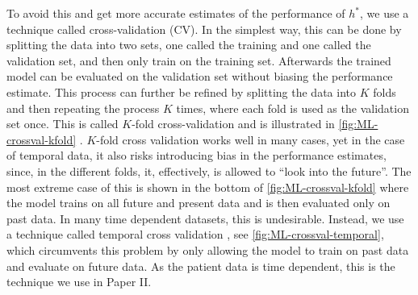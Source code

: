 To avoid this and get more accurate estimates of the performance of $h^*$, we use a technique called cross-validation (CV). In the simplest way, this can be done by splitting the data into two sets, one called the training and one called the validation set, and then only train on the training set. Afterwards the trained model can be evaluated on the validation set without biasing the performance estimate. This process can further be refined by splitting the data into $K$ folds and then repeating the process $K$ times, where each fold is used as the validation set once.
This is called $K$-fold cross-validation and is illustrated in \autoref{fig:ML-crossval-kfold} \autocite{murphyMachineLearningProbabilistic2012,hastieElementsStatisticalLearning2016}.
$K$-fold cross validation works well in many cases, yet in the case of temporal data, it also risks introducing bias in the performance estimates, since, in the different folds, it, effectively, is allowed to ``look into the future''. The most extreme case of this is shown in the bottom of \autoref{fig:ML-crossval-kfold} where the model trains on all future and present data and is then evaluated only on past data. In many time dependent datasets, this is undesirable. Instead, we use a technique called temporal cross validation \autocite{tashmanOutofsampleTestsForecasting2000a}, see \autoref{fig:ML-crossval-temporal}, which circumvents this problem by only allowing the model to train on past data and evaluate on future data. As the patient data is time dependent, this is the technique we use in Paper II.

